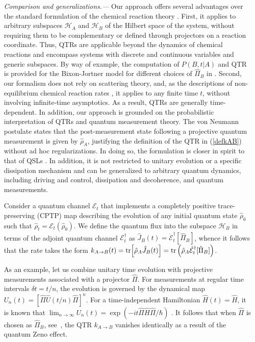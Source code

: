 \documentclass[prl,aps,amssymb,twocolumn,superscriptaddress, notitlepage, longbibliography]{revtex4-2}
\begin{document}
{\it Comparison and generalizations.---}
Our approach offers several advantages over the standard formulation of the chemical reaction theory \cite{Levine1969,Miller74,Miller83,Miller93,Miller03}. First, it applies to arbitrary subspaces $\mathcal{H}_A$ and $\mathcal{H}_B$ of the Hilbert space of the system, without requiring them to be complementary or defined through projectors on a reaction coordinate. Thus, QTRs are applicable beyond the dynamics of chemical reactions and encompass systems with discrete and continuous variables and generic subspaces. By way of example, the computation of $P(B,t|A)$ and QTR  is provided for the Bixon-Jortner model \cite{BixonJortner_1968} for different choices of $\hat{\Pi}_B$ in \cite{SM}.
Second, our formalism does not rely on scattering theory, and, as the descriptions of non-equilibrium chemical reaction rates \cite{MakarovMetiu1997,BoseNancy17},
it applies to any finite time $t$, without involving infinite-time asymptotics.
As a result, QTRs are generally time-dependent.
In addition, our approach is grounded on the probabilistic interpretation of QTRs and quantum measurement theory. The von Neumann postulate states that the post-measurement state following a projective quantum measurement is given by $\hat{\rho}_A$, justifying the definition of the QTR in (\ref{defkAB}) without ad hoc regularizations.
In doing so, the formulation is closer in spirit to that of QSLs \cite{Deffner2017}. In addition, it is not restricted to unitary evolution or a specific dissipation mechanism \cite{Hanggi90} and can be generalized to arbitrary quantum dynamics, including driving and control, dissipation and decoherence, and quantum measurements.

Consider a quantum channel $\mathcal{E}_t$ that implements a completely positive trace-preserving (CPTP) map describing the evolution of any initial quantum state $\hat{\rho}_0$ such that $\hat{\rho}_t=\mathcal{E}_t(\hat{\rho}_0)$.
We define the quantum flux into the subspace $\mathcal H_B$ in terms of the adjoint quantum channel $\mathcal{E}_t^\dag$ as
$\hat{J}_B \left( t \right)
=
\dot{\mathcal{E}}_t^\dag [
\hat{\Pi}_B
]$,
whence it follows that the rate takes the form $k_{A\rightarrow B}(t)=\tr[\hat{\rho}_A \hat{J}_B(t)]=\tr\left(\hat{\rho}_A\dot{\mathcal{E}}_t^\dag [
\hat{\Pi}_B
]\right)$.

As an example, let us combine unitary time evolution with projective measurements associated with a projector $\hat{\Pi}$. For measurements at regular time intervals $\delta t=t/n$,  the evolution is governed by the dynamical map
$U_n(t)=[\hat{\Pi} \hat{U}(t/n)\hat{\Pi} ]^n$.
For a time-independent Hamiltonian $\hat{H}(t)=\hat H$, it is known that
$\lim_{n\rightarrow\infty} U_n(t)=\exp(-it \hat{\Pi} \hat{H}\hat{\Pi}/\hbar)$ \cite{Facchi08}. It follows that when $\hat{\Pi}$ is chosen as $\hat{\Pi}_B$, see~\cite{SM}, the QTR $k_{A\rightarrow B}$ vanishes identically as a result of the quantum Zeno effect.
\end{document}
